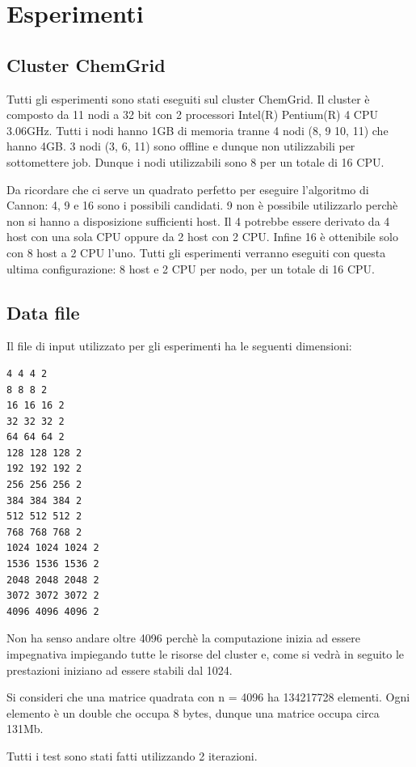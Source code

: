 \chapter{Esperimenti}

\section{Cluster ChemGrid}

Tutti gli esperimenti sono stati eseguiti sul cluster ChemGrid. Il cluster \`{e} composto da 11 nodi a 32 bit con 2 processori Intel(R) Pentium(R) 4 CPU 3.06GHz. Tutti i nodi hanno 1GB di memoria tranne 4 nodi (8, 9 10, 11) che hanno 4GB. 3 nodi (3, 6, 11) sono offline e dunque non utilizzabili per sottomettere job. Dunque i nodi utilizzabili sono 8 per un totale di 16 CPU.

Da ricordare che ci serve un quadrato perfetto per eseguire l'algoritmo di Cannon: 4, 9 e 16 sono i possibili candidati. 9 non \`{e} possibile utilizzarlo perch\`{e} non si hanno a disposizione sufficienti host.
Il 4 potrebbe essere derivato da 4 host con una sola CPU oppure da 2 host con 2 CPU. Infine 16 \`{e} ottenibile solo con 8 host a 2 CPU l'uno.
Tutti gli esperimenti verranno eseguiti con questa ultima configurazione: 8 host e 2 CPU per nodo, per un totale di 16 CPU.

\section{Data file}

Il file di input utilizzato per gli esperimenti ha le seguenti dimensioni:

\begin{lstlisting}
4 4 4 2
8 8 8 2
16 16 16 2
32 32 32 2
64 64 64 2
128 128 128 2
192 192 192 2
256 256 256 2
384 384 384 2
512 512 512 2
768 768 768 2
1024 1024 1024 2
1536 1536 1536 2
2048 2048 2048 2
3072 3072 3072 2
4096 4096 4096 2
\end{lstlisting}

Non ha senso andare oltre 4096 perch\`{e} la computazione inizia ad essere impegnativa impiegando tutte le risorse del cluster e, come si vedr\`{a} in seguito le prestazioni iniziano ad essere stabili dal 1024.

Si consideri che una matrice quadrata con n = 4096 ha 134217728 elementi. Ogni elemento \`{e} un double che occupa 8 bytes, dunque una matrice occupa circa 131Mb.

Tutti i test sono stati fatti utilizzando 2 iterazioni.

